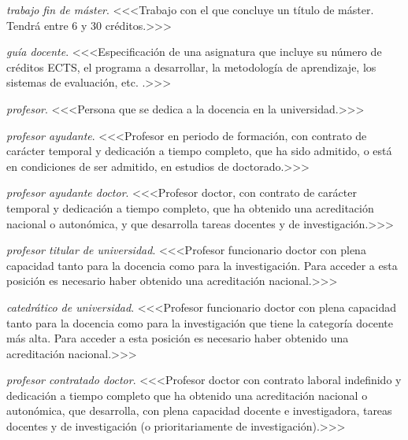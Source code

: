     \item \emph{trabajo fin de máster}. <<<Trabajo con el que concluye un título
        de máster\cite[artículo 15, apartado 3]{rd1393}. Tendrá entre 6 y 30 créditos.>>>

    \item \emph{guía docente}. <<<Especificación de una asignatura que incluye su
        número de créditos ECTS, el programa a desarrollar, la metodología de
        aprendizaje, los sistemas de evaluación, etc. \cite[sección
        D.5]{guiaMadridMasD}.>>>

    \item \emph{profesor}. <<<Persona que se dedica a la docencia en la
        universidad.>>>

    \item \emph{profesor ayudante}. <<<Profesor en periodo de formación, con
        contrato de carácter temporal y dedicación a tiempo completo, que ha
        sido admitido, o está en condiciones de ser admitido, en estudios de
        doctorado\cite[artículo 49]{leyUniversidades}.>>>

    \item \emph{profesor ayudante doctor}. <<<Profesor doctor, con contrato de
        carácter temporal y dedicación a tiempo completo, que ha obtenido una
        acreditación nacional o autonómica, y que desarrolla tareas docentes y de
        investigación\cite[artículo 50]{leyUniversidades}.>>>  

    \item \emph{profesor titular de universidad}. <<<Profesor funcionario doctor con plena
        capacidad tanto para la docencia como para la
        investigación. Para acceder a esta posición es necesario haber obtenido
        una acreditación nacional\cite{leyUniversidades}.>>>

    \item \emph{catedrático de universidad}. <<<Profesor funcionario doctor con plena
        capacidad tanto para la docencia como para la investigación que tiene
        la categoría docente más alta. Para acceder a esta posición es
        necesario haber obtenido una acreditación nacional\cite{leyUniversidades}.>>>

    \item \emph{profesor contratado doctor}. <<<Profesor doctor con contrato
        laboral indefinido y dedicación a tiempo completo que ha obtenido una
        acreditación nacional o autonómica, que desarrolla, con plena capacidad
        docente e investigadora, tareas docentes y de investigación (o
        prioritariamente de investigación)\cite[artículo 52]{leyUniversidades}.>>>

